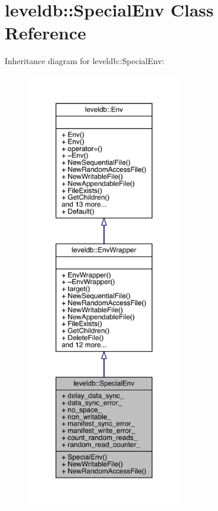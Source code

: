 \hypertarget{classleveldb_1_1_special_env}{}\section{leveldb\+::Special\+Env Class Reference}
\label{classleveldb_1_1_special_env}


Inheritance diagram for leveldb\+::Special\+Env\+:
\nopagebreak
\begin{figure}[H]
\begin{center}
\leavevmode
\includegraphics[height=550pt]{classleveldb_1_1_special_env__inherit__graph}
\end{center}
\end{figure}


